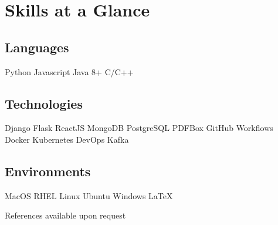 \documentclass[]{resume-template}
\begin{document}


\section{Skills at a Glance}
\begin{multicols}{3}
\subsection{Languages}
Python  \textbullet{} Javascript \textbullet{} Java 8+ \textbullet{}   C/C++
\columnbreak

\subsection{Technologies}
Django \textbullet{} Flask \textbullet{} ReactJS \textbullet{} MongoDB \textbullet{} PostgreSQL \textbullet{} PDFBox \textbullet{} GitHub Workflows \textbullet{} Docker \textbullet{} Kubernetes \textbullet{} DevOps  \textbullet{}  Kafka
\columnbreak

\subsection{Environments}
MacOS  \textbullet{}  RHEL Linux \textbullet{} Ubuntu \textbullet{} Windows \textbullet{} \LaTeX  
\vspace{-1ex}
\end{multicols}
\sectionsep
\begin{center}
References available upon request
\end{center}
\end{document}
